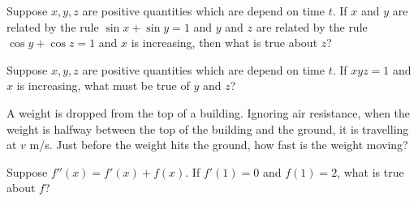 \documentclass{ximera}
\newcommand{\recommendation}[1]{}
\begin{document}
\begin{shuffle}
\begin{problem}
  Suppose $x, y, z$ are positive quantities which are depend on time
  $t$.  If $x$ and $y$ are related by the rule $\sin x + \sin y = 1$ and $y$
  and $z$ are related by the rule $\cos y + \cos z = 1$ and $x$ is
  increasing, then what is true about $z$?
  \begin{multipleChoice}
  \end{multipleChoice}
\end{problem}

\begin{problem}
  Suppose $x, y, z$ are positive quantities which are depend on time
  $t$.  If $xyz = 1$ and $x$ is increasing, what must be true of $y$ and $z$?
  \begin{multipleChoice}
  \end{multipleChoice}
\end{problem}



\begin{problem}
  A weight is dropped from the top of a building.  Ignoring air
  resistance, when the weight is halfway between the top of the
  building and the ground, it is travelling at $v$ m/s.  Just before
  the weight hits the ground, how fast is the weight moving?
  \begin{multipleChoice}
  \end{multipleChoice}
\end{problem}



\begin{problem}
  Suppose $f''(x) = f'(x) + f(x)$.  If $f'(1) = 0$ and $f(1) = 2$, what is true about $f$?
  \begin{multipleChoice}
  \end{multipleChoice}
\end{problem}


\end{shuffle}
\end{document}

